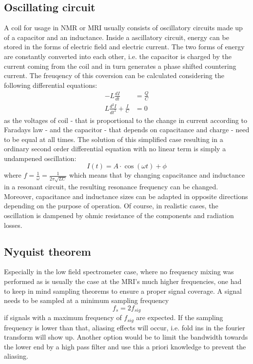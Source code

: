             \subsection{Oscillating circuit}
                A coil for usage in NMR or MRI usually consists of oscillatory circuits made up of a capacitor and an inductance. Inside a ascillatory circuit, energy can be stored in the forms of electric field and electric current. The two forms of energy are constantly converted into each other, i.e. the capacitor is charged by the current coming from the coil and in turn generates a phase shifted countering current. The freuqency of this coversion can be calculated considering the following differential equations:
                \begin{equation}
                    \begin{aligned}
                        -L\frac{dI}{dt} &= \frac{Q}{C} \\
                        L\frac{d^2I}{dt^2} + \frac{I}{C} &= 0
                    \end{aligned}
                \end{equation}
                as the voltages of coil - that is proportional to the change in current according to Faradays law - and the capacitor - that depends on capacitance and charge - need to be equal at all times. The solution of this simplified case resulting in a ordinary second order differential equation with no linear term is simply a undampened oscillation:
                \begin{equation}
                    I(t) =  A \cdot \cos(\omega t) + \phi 
                \end{equation}
                where $f= \frac{1}{\omega} = \frac{1}{2\pi\sqrt{LC}}$ which means that by changing capacitance and inductance in a resonant circuit, the resulting resonance frequency can be changed. Moreover, capacitance and inductance sizes can be adapted in opposite directions depending on the purpose of operation.
                Of course, in realistic cases, the oscillation is dampened by ohmic resistance of the components and radiation losses.
            \subsection{Nyquist theorem}
                Especially in the low field spectrometer case, where no frequency mixing was performed as is usually the case at the MRI's much higher frequencies, one had to keep in mind sampling theorems to ensure a proper signal coverage. A signal needs to be sampled at a minimum sampling frequency
                \begin{equation}
                    f_{s} = 2 f_{sig}
                \end{equation}
                if signals with a maximum frequency of $f_{sig}$ are expected. If the sampling frequency is lower than that, aliasing effects will occur, i.e. fold ins in the fourier transform will show up.
                Another option would be to limit the bandwidth towards the lower end by a high pass filter and use this a priori knowledge to prevent the aliasing.
